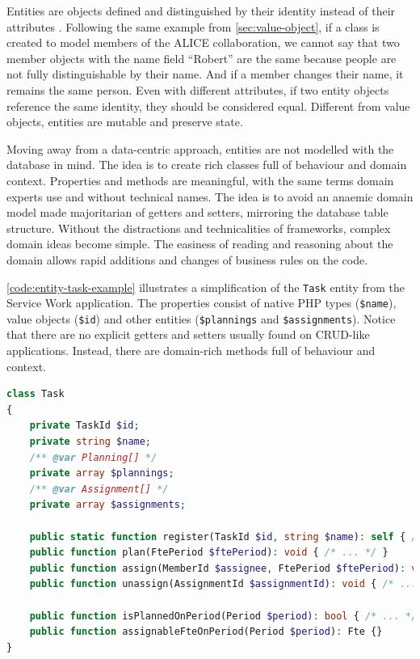 Entities are objects defined and distinguished by their identity instead of their attributes \cite{ddd-blue-book}. Following the same example from \autoref{sec:value-object}, if a class is created to model members of the ALICE collaboration, we cannot say that two member objects with the name field “Robert” are the same because people are not fully distinguishable by their name. And if a member changes their name, it remains the same person. Even with different attributes, if two entity objects reference the same identity, they should be considered equal. Different from value objects, entities are mutable and preserve state.

Moving away from a data-centric approach, entities are not modelled with the database in mind. The idea is to create rich classes full of behaviour and domain context. Properties and methods are meaningful, with the same terms domain experts use and without technical names. The idea is to avoid an anaemic domain model \cite{ddd-blue-book} \cite{martin-fowler-anemic-domian-model} made majoritarian of getters and setters, mirroring the database table structure. Without the distractions and technicalities of frameworks, complex domain ideas become simple. The easiness of reading and reasoning about the domain allows rapid additions and changes of business rules on the code.

\autoref{code:entity-task-example} illustrates a simplification of the \texttt{Task} entity from the Service Work application. The properties consist of native PHP types (\texttt{\$name}), value objects (\texttt{\$id}) and other entities (\texttt{\$plannings} and \texttt{\$assignments}). Notice that there are no explicit getters and setters usually found on CRUD-like applications. Instead, there are domain-rich methods full of behaviour and context.

\begin{lstlisting}[language=PHP,label={code:entity-task-example},caption={Entity to model the domain concept of a Service Work Task.}]
class Task
{
	private TaskId $id;
	private string $name;
	/** @var Planning[] */
	private array $plannings;
	/** @var Assignment[] */
	private array $assignments;

	public static function register(TaskId $id, string $name): self { /* ... */}
	public function plan(FtePeriod $ftePeriod): void { /* ... */ }
	public function assign(MemberId $assignee, FtePeriod $ftePeriod): void { /* ... */ }
	public function unassign(AssignmentId $assignmentId): void { /* ... */ }

	public function isPlannedOnPeriod(Period $period): bool { /* ... */ }
	public function assignableFteOnPeriod(Period $period): Fte {}
}
\end{lstlisting}

